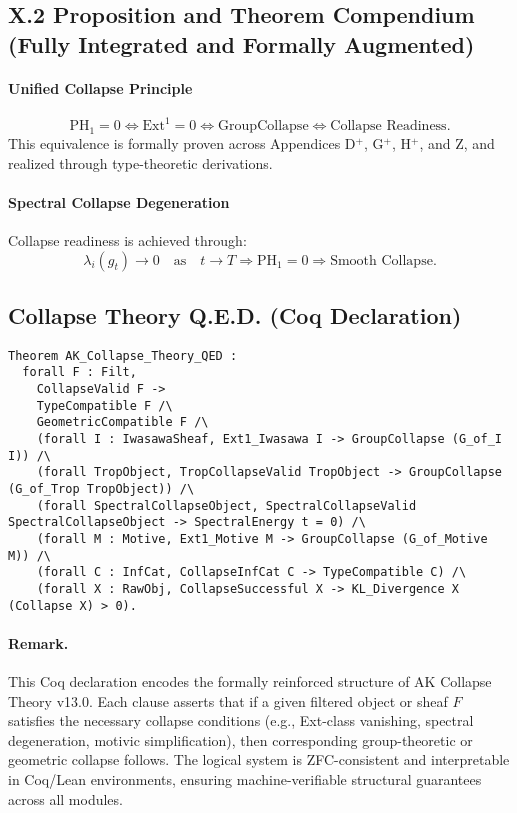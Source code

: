 \documentclass[11pt]{article}
\begin{document}
\subsection*{X.2 Proposition and Theorem Compendium (Fully Integrated and Formally Augmented)}

\paragraph{Unified Collapse Principle}
\[
\mathrm{PH}_1 = 0 \iff \mathrm{Ext}^1 = 0 \iff \mathrm{GroupCollapse} \iff \text{Collapse Readiness}.
\]
This equivalence is formally proven across Appendices D$^{+}$, G$^{+}$, H$^{+}$, and Z, and realized through type-theoretic derivations.

\paragraph{Spectral Collapse Degeneration}
Collapse readiness is achieved through:
\[
\lambda_i(g_t) \longrightarrow 0 \quad \text{as} \quad t \to T \Rightarrow \mathrm{PH}_1 = 0 \Rightarrow \text{Smooth Collapse}.
\]

\subsection*{Collapse Theory Q.E.D. (Coq Declaration)}

\begin{lstlisting}[language=Coq, caption={Formal Q.E.D. Declaration of AK Collapse Theory}]
Theorem AK_Collapse_Theory_QED :
  forall F : Filt,
    CollapseValid F ->
    TypeCompatible F /\
    GeometricCompatible F /\
    (forall I : IwasawaSheaf, Ext1_Iwasawa I -> GroupCollapse (G_of_I I)) /\
    (forall TropObject, TropCollapseValid TropObject -> GroupCollapse (G_of_Trop TropObject)) /\
    (forall SpectralCollapseObject, SpectralCollapseValid SpectralCollapseObject -> SpectralEnergy t = 0) /\
    (forall M : Motive, Ext1_Motive M -> GroupCollapse (G_of_Motive M)) /\
    (forall C : InfCat, CollapseInfCat C -> TypeCompatible C) /\
    (forall X : RawObj, CollapseSuccessful X -> KL_Divergence X (Collapse X) > 0).
\end{lstlisting}


\paragraph{Remark.}
This Coq declaration encodes the formally reinforced structure of AK Collapse Theory v13.0.  
Each clause asserts that if a given filtered object or sheaf \( F \) satisfies the necessary collapse conditions (e.g., Ext-class vanishing, spectral degeneration, motivic simplification), then corresponding group-theoretic or geometric collapse follows.  
The logical system is ZFC-consistent and interpretable in Coq/Lean environments, ensuring machine-verifiable structural guarantees across all modules.
\end{document}
